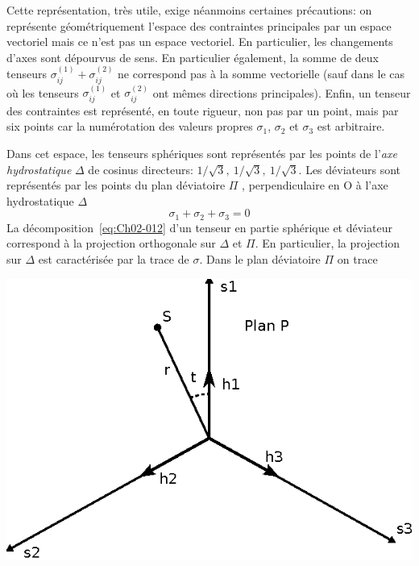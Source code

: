 Cette représentation, très utile, exige néanmoins certaines précautions: on représente géométriquement l'espace des contraintes principales par un espace vectoriel mais ce n'est pas un espace vectoriel.
En particulier, les changements d'axes sont dépourvus de sens.
En particulier également, la somme de deux tenseurs $\sigma_{ij}^{(1)} + \sigma_{ij}^{(2)}$ ne correspond pas à la somme vectorielle (sauf dans le cas où les tenseurs $\sigma_{ij}^{(1)}$ et $\sigma_{ij}^{(2)}$ ont mêmes directions principales).
Enfin, un tenseur des contraintes est représenté, en toute rigueur, non pas par un point, mais par six points car la numérotation des valeurs propres $\sigma_1$, $\sigma_2$ et $\sigma_3$ est arbitraire. 

Dans cet espace, les tenseurs sphériques sont représentés par les points de l'\emph{axe hydrostatique} $\Delta$ de cosinus directeurs: $1/\sqrt{3},\ 1/\sqrt{3},\ 1/\sqrt{3}$.
Les déviateurs sont représentés par les points du plan déviatoire $\Pi$ , perpendiculaire en O à l'axe hydrostatique $\Delta$
\begin{equation}
    \sigma_1 + \sigma_2 + \sigma_3 = 0
    \label{eq:Ch02-027}
\end{equation}
La décomposition~\eqref{eq:Ch02-012} d'un tenseur en partie sphérique et déviateur correspond à la projection orthogonale sur $\Delta$ et $\Pi$.
En particulier, la projection sur $\Delta$ est caractérisée par la trace de $\mathbb{\sigma}$.
Dans le plan déviatoire $\Pi$ on trace 
\begin{center}
    \includegraphics{../images/T1_Ch02-0013}
\end{center}
